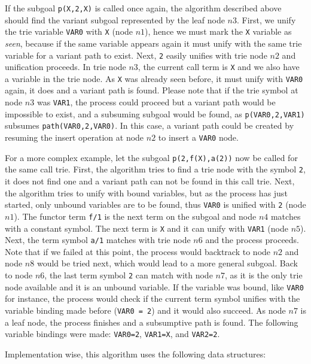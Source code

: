 If the subgoal \texttt{p(X,2,X)} is called once again, the algorithm described above
should find the variant subgoal represented by the leaf node $n3$. First, we unify the trie variable
\texttt{VAR0} with \texttt{X} (node $n1$), hence we must mark the \texttt{X} variable as \textit{seen},
because if the same variable appears again it must unify with the same trie variable for a variant path
to exist. Next, \texttt{2} easily unifies with trie node $n2$ and unification proceeds. In trie node $n3$,
the current call term is \texttt{X} and we also have a variable in the trie node. As \texttt{X} was already seen before,
it must unify with \texttt{VAR0} again, it does and a variant path is found. Please note that if
the trie symbol at node $n3$ was \texttt{VAR1}, the process could proceed but a variant path would be impossible
to exist, and a subsuming subgoal would be found, as \texttt{p(VAR0,2,VAR1)} subsumes \texttt{path(VAR0,2,VAR0)}.
In this case, a variant path could be created by resuming the insert operation at node $n2$ to insert
a \texttt{VAR0} node.

For a more complex example, let the subgoal \texttt{p(2,f(X),a(2))} now be called for the same call trie. First,
the algorithm tries to find a trie node with the symbol \texttt{2}, it does not find one and a variant path
can not be found in this call trie. Next, the algorithm tries to unify with bound variables, but as the process
has just started, only unbound variables are to be found, thus \texttt{VAR0} is unified with \texttt{2} (node $n1$).
The functor term \texttt{f/1} is the next term on the subgoal and node $n4$ matches with a constant symbol.
The next term is \texttt{X} and it can unify with \texttt{VAR1} (node $n5$).
Next, the term symbol \texttt{a/1} matches with trie node $n6$ and the process proceeds. Note that if we failed
at this point, the process would backtrack to node $n2$ and node $n8$ would be tried next, which would
lead to a more general subgoal. Back to node $n6$, the last term symbol \texttt{2} can match with node $n7$, as it is the only trie
node available and it is an unbound variable. If the variable was bound, like \texttt{VAR0} for instance,
the process would check if the current term symbol unifies with the variable binding made before (\texttt{VAR0 = 2}) and
it would also succeed. As node $n7$ is a leaf node, the process finishes and a subsumptive path is found.
The following variable bindings were made: \texttt{VAR0=2}, \texttt{VAR1=X}, and \texttt{VAR2=2}.

Implementation wise, this algorithm uses the following data structures:

